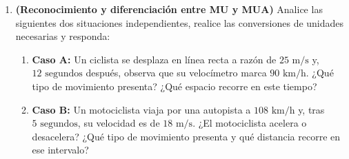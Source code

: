 \documentclass[11pt, letterpaper]{article}
\newif\ifmostrarrespuestas
\newcommand{\respuesta}[1]{
	\ifmostrarrespuestas
	\par\vspace{0.2cm}
	\begin{tcolorbox}[colback=blue!5!white, colframe=valblue, boxrule=0.5pt, arc=1mm, left=2mm, right=2mm, top=1.5mm, bottom=1.5mm]
		\footnotesize \textbf{\textcolor{valblue}{Solución:}} \textcolor{blue!80!black}{#1}
	\end{tcolorbox}
	\vspace{0.2cm}
	\fi
}
\begin{document}
	\begin{enumerate}[leftmargin=*, itemsep=0.6cm]
		
		\item \textbf{(Reconocimiento y diferenciación entre MU y MUA)} Analice las siguientes dos situaciones independientes, realice las conversiones de unidades necesarias y responda:
		\begin{enumerate}[label=\alph*., itemsep=0.2cm]
			\item \textbf{Caso A:} Un ciclista se desplaza en línea recta a razón de $25\text{ m/s}$ y, $12\text{ segundos}$ después, observa que su velocímetro marca $90\text{ km/h}$. ¿Qué tipo de movimiento presenta? ¿Qué espacio recorre en este tiempo?
			\item \textbf{Caso B:} Un motociclista viaja por una autopista a $108\text{ km/h}$ y, tras $5\text{ segundos}$, su velocidad es de $18\text{ m/s}$. ¿El motociclista acelera o desacelera? ¿Qué tipo de movimiento presenta y qué distancia recorre en ese intervalo?
		\end{enumerate}
		\respuesta{
			\textbf{a) Caso A:} Convertimos $90\text{ km/h}$ a $\text{m/s}$: $90 \times \frac{1000}{3600} = 25\text{ m/s}$. Como $v_0 = v_f = 25\text{ m/s}$, no hay cambio de velocidad ($a = 0\text{ m/s}^2$), por tanto presenta \textbf{Movimiento Uniforme (MU)}. Distancia con ec. (2.I): $d = v \cdot t = 25\text{ m/s} \cdot 12\text{ s} = \mathbf{300\text{ m}}$.\\[0.1cm]
			\textbf{b) Caso B:} Convertimos $108\text{ km/h}$ a $\text{m/s}$: $v_0 = 30\text{ m/s}$. Al pasar a $v_f = 18\text{ m/s}$ en $t = 5\text{ s}$, su velocidad disminuye (\textbf{desacelera}), presentando un \textbf{Movimiento Uniforme Desacelerado $\text{MUA}(-)$}.\\
			Con ec. (2.II): $a = \frac{18 - 30}{5} = \mathbf{-2.4\text{ m/s}^2}$. Con ec. (2.III): $x = 0 + 30(5) + \frac{(-2.4)(5)^2}{2} = 150 - 30 = \mathbf{120\text{ m}}$.
		}
		

\end{enumerate}
\end{document}
